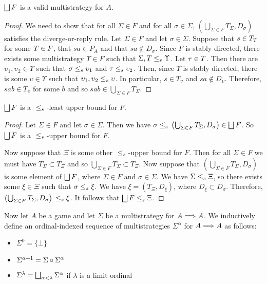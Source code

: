 \documentclass{article}
\begin{document}
\begin{proposition}
  $\bigsqcup F$ is a valid multistrategy for $A$.
  \begin{proof}
    We need to show that for all $\Sigma\in F$ and for all $\sigma\in\Sigma$, $\left(\bigcup_{\Sigma\in F}T_\Sigma,D_\sigma\right)$ satisfies the diverge-or-reply rule.  Let $\Sigma\in F$ and let $\sigma\in\Sigma$.  Suppose that $s\in T_T$ for some $T\in F$, that $sa\in P_A$ and that $sa\not\in D_\sigma$.  Since $F$ is stably directed, there exists some multistrategy $\Upsilon\in F$ such that $\Sigma,T{\;\le_s\;}\Upsilon$.  Let $\tau\in T$.  Then there are $\upsilon_1,\upsilon_2\in\Upsilon$ such that $\sigma{\;\le_s\;}\upsilon_1$ and $\tau{\;\le_s\;}\upsilon_2$.  Then, since $\Upsilon$ is stably directed, there is some $\upsilon\in\Upsilon$ such that $\upsilon_1,\upsilon_2{\;\le_s\;}\upsilon$.  In particular, $s\in T_\upsilon$ and $sa\not\in D_\upsilon$.  Therefore, $sab\in T_\upsilon$ for some $b$ and so $sab\in\bigcup_{\Sigma\in F}T_\Sigma$.
  \end{proof}
\end{proposition}

\begin{proposition}
  $\bigsqcup F$ is a ${\;\le_s\;}$-least upper bound for $F$.

  \begin{proof}
    Let $\Sigma\in F$ and let $\sigma\in\Sigma$.  Then we have $\sigma{\;\le_s\;}\left(\bigcup_{\Sigma\in F}T_\Sigma,D_\sigma\right)\in\bigsqcup F$.  So $\bigsqcup F$ is a ${\;\le_s\;}$-upper bound for $F$.

    Now suppose that $\Xi$ is some other ${\;\le_s\;}$-upper bound for $F$.  Then for all $\Sigma\in F$ we must have $T_\Sigma\subset T_\Xi$ and so $\bigcup_{\Sigma\in F}T_\Sigma\subset T_\Xi$.  Now suppose that $\left(\bigcup_{\Sigma\in F}T_\Sigma,D_\sigma\right)$ is some element of $\bigsqcup F$, where $\Sigma\in F$ and $\sigma\in\Sigma$.  We have $\Sigma{\;\le_s\;}\Xi$, so there exists some $\xi\in\Xi$ such that $\sigma{\;\le_s\;}\xi$.  We have $\xi = (T_\Xi, D_\xi)$, where $D_\xi\subset D_\sigma$.  Therefore, $\left(\bigcup_{\Sigma\in F}T_\Sigma,D_\sigma\right){\;\le_s\;}\xi$.  It follows that $\bigsqcup F{\;\le_s\;}\Xi$.
  \end{proof}
\end{proposition}

Now let $A$ be a game and let $\Sigma$ be a multistrategy for $A\Longrightarrow A$.  We inductively define an ordinal-indexed sequence of multistrategies $\Sigma^\alpha$ for $A\Longrightarrow A$ as follows:
\begin{itemize}
  \item $\Sigma^0 = \{\bot\}$
  \item $\Sigma^{\alpha+1} = \Sigma \circ \Sigma^\alpha$
  \item $\Sigma^{\lambda} = \bigsqcup_{\alpha<\lambda}\Sigma^\alpha$ if $\lambda$ is a limit ordinal
\end{itemize}
\end{document}
